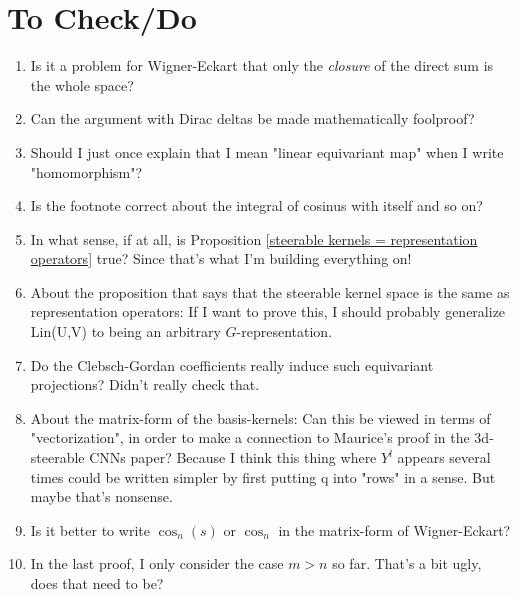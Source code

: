 \documentclass[12pt, a4paper]{article}
\theoremstyle{plain}
\theoremstyle{definition}
\theoremstyle{remark}
\begin{document}
\section{To Check/Do}

\begin{enumerate}
\item Is it a problem for Wigner-Eckart that only the \emph{closure} of the direct sum is the whole space?
\item Can the argument with Dirac deltas be made mathematically foolproof?
\item Should I just once explain that I mean "linear equivariant map" when I write "homomorphism"?
\item Is the footnote correct about the integral of cosinus with itself and so on?
\item In what sense, if at all, is Proposition \ref{steerable kernels = representation operators} true? Since that's what I'm building everything on!
\item About the proposition that says that the steerable kernel space is the same as representation operators: If I want to prove this, I should probably generalize Lin(U,V) to being an arbitrary $G$-representation.
\item Do the Clebsch-Gordan coefficients really induce such equivariant projections? Didn't really check that.
\item About the matrix-form of the basis-kernels: Can this be viewed in terms of "vectorization", in order to make a connection to Maurice's proof in the 3d-steerable CNNs paper? Because I think this thing where $Y^l$ appears several times could be written simpler by first putting q into "rows" in a sense. But maybe that's nonsense.
\item Is it better to write $\cos_n(s)$ or $\cos_n$ in the matrix-form of Wigner-Eckart?
\item In the last proof, I only consider the case $m > n$ so far. That's a bit ugly, does that need to be?
\end{enumerate}
\end{document}
